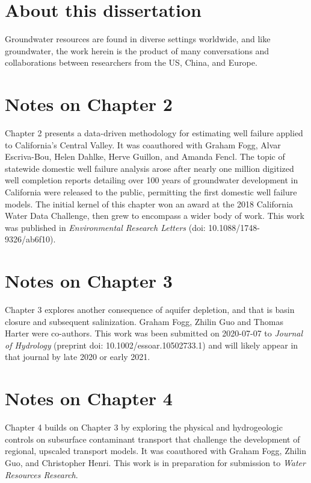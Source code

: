 \section*{About this dissertation}   

Groundwater resources are found in diverse settings worldwide, and like groundwater, the work herein is the product of many conversations and collaborations between researchers from the US, China, and Europe. 


\section*{Notes on Chapter 2}

Chapter 2 presents a data-driven methodology for estimating well failure applied to California's Central Valley. It was coauthored with Graham Fogg, Alvar Escriva-Bou, Helen Dahlke, Herve Guillon, and Amanda Fencl. The topic of statewide domestic well failure analysis arose after nearly one million digitized well completion reports detailing over 100 years of groundwater development in California were released to the public, permitting the first domestic well failure models. The initial kernel of this chapter won an award at the 2018 California Water Data Challenge, then grew to encompass a wider body of work. This work was published in \textit{Environmental Research Letters} (doi: 10.1088/1748-9326/ab6f10).

   
\section*{Notes on Chapter 3} 

Chapter 3 explores another consequence of aquifer depletion, and that is basin closure and subsequent salinization. Graham Fogg, Zhilin Guo and Thomas Harter were co-authors. This work was been submitted on 2020-07-07 to \textit{Journal of Hydrology} (preprint doi: 10.1002/essoar.10502733.1) and will likely appear in that journal by late 2020 or early 2021. 
    
    
\section*{Notes on Chapter 4} 

Chapter 4 builds on Chapter 3 by exploring the physical and hydrogeologic controls on subsurface contaminant transport that challenge the development of regional, upscaled transport models. It was coauthored with Graham Fogg, Zhilin Guo, and Christopher Henri. This work is in preparation for submission to \textit{Water Resources Research}. 

